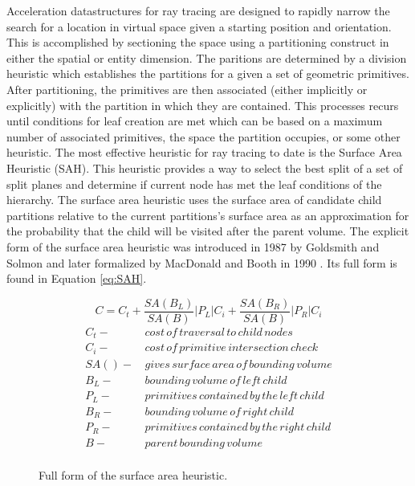 \documentclass[12pt, a4paper]{article}
\begin{document}
Acceleration datastructures for ray tracing are designed to rapidly narrow the search for a location in virtual space given a starting position and orientation. This is accomplished by sectioning the space using a partitioning construct in either the spatial or entity dimension. The paritions are determined by a division heuristic which establishes the partitions for a given a set of geometric primitives. After partitioning, the primitives are then associated (either implicitly or explicitly) with the partition in which they are contained. This processes recurs until conditions for leaf creation are met which can be based on a maximum number of associated primitives, the space the partition occupies, or some other heuristic. The most effective heuristic for ray tracing to date is the Surface Area Heuristic (SAH). This heuristic provides a way to select the best split of a set of split planes and determine if current node has met the leaf conditions of the hierarchy. The surface area heuristic uses the surface area of candidate child partitions relative to the current partitions's surface area as an approximation for the probability that the child will be visited after the parent volume. The explicit form of the surface area heuristic was introduced in 1987 by Goldsmith and Solmon \cite{Goldsmith_1987} and later formalized by MacDonald and Booth in 1990 \cite{MacDonald_1990}. Its full form is found in Equation \ref{eq:SAH}.


\begin{figure}[H]
  \begin{equation}
    C =  C_{t} + \frac{SA(B_{L})}{SA(B)} |P_{L}|C_{i} +  \frac{SA(B_{R})}{SA(B)} |P_{R}|C_{i}
    \label{eq:SAH}
  \end{equation}
  \begin{align*}
    C_{t} - & \,cost\, of\, traversal\, to\, child\, nodes \\
    C_{i} - & \, cost\, of\, primitive\, intersection\, check\, \\
    SA() - & \, gives\, surface\, area\, of\, bounding\, volume \\
    B_{L} - &  \, bounding\, volume\, of\, left\, child \\
    P_{L} - & \, primitives\, contained\, by\, the\, left\, child  \\
    B_{R} - & \, bounding\, volume\, of\, right\, child \\
    P_{R} - & \, primitives\, contained\, by\, the\, right\, child \\
    B - & \, parent\, bounding\, volume \\
  \end{align*}
  \caption{Full form of the surface area heuristic.}
  \label{fig:SAH}
\end{figure}
\end{document}
